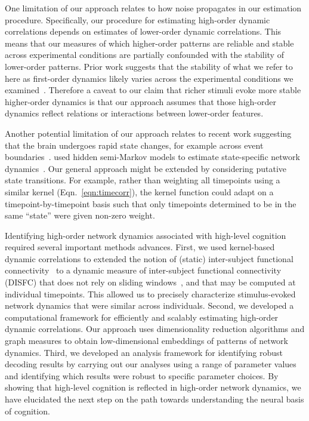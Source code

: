 \documentclass[english]{article}
\begin{document}
One limitation of our approach relates to how noise propagates in our
estimation procedure.  Specifically, our procedure for estimating
high-order dynamic correlations depends on estimates of lower-order
dynamic correlations.  This means that our measures of which
higher-order patterns are reliable and stable across experimental
conditions are partially confounded with the stability of lower-order
patterns.  Prior work suggests that the stability of what we refer to
here as first-order dynamics likely varies across the experimental
conditions we examined~\citep{SimoEtal16}.  Therefore a caveat to our
claim that richer stimuli evoke more stable higher-order dynamics is
that our approach assumes that those high-order dynamics reflect
relations or interactions between lower-order features.

Another potential limitation of our approach relates to recent work
suggesting that the brain undergoes rapid state changes, for example
across event boundaries~\citep[e.g.,][]{BaldEtal17}.
\cite{ShapEtal19} used hidden semi-Markov models to estimate
state-specific network dynamics~\citep[also see][]{VidaEtal18}.  Our
general approach might be extended by considering putative state
transitions. For example, rather than weighting all timepoints using a
similar kernel (Eqn.~\ref{eqn:timecorr}), the kernel function could
adapt on a timepoint-by-timepoint basis such that only timepoints
determined to be in the same ``state'' were given non-zero weight.

Identifying high-order network dynamics associated with high-level
cognition required several important methods advances.  First, we used
kernel-based dynamic correlations to extended the notion of (static)
inter-subject functional connectivity~\citep{SimoEtal16} to a dynamic
measure of inter-subject functional connectivity (DISFC) that does not
rely on sliding windows~\citep[e.g., as in][]{MannEtal18}, and that
may be computed at individual timepoints.  This allowed us to
precisely characterize stimulus-evoked network dynamics that were
similar across individuals.  Second, we developed a computational
framework for efficiently and scalably estimating high-order dynamic
correlations.  Our approach uses dimensionality reduction algorithms
and graph measures to obtain low-dimensional embeddings of patterns of
network dynamics.  Third, we developed an analysis framework for
identifying robust decoding results by carrying out our analyses using
a range of parameter values and identifying which results were robust
to specific parameter choices. By showing that high-level cognition is
reflected in high-order network dynamics, we have elucidated the next
step on the path towards understanding the neural basis of cognition.
\end{document}
